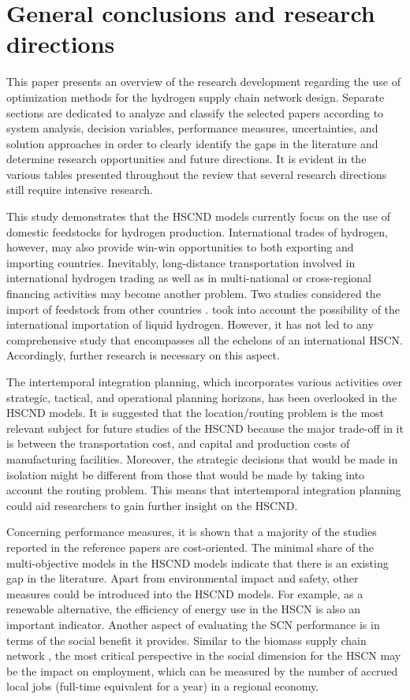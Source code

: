 \documentclass[11pt,3p]{elsarticle}
\begin{document}
\section{General conclusions and research directions}
\label{sec:synthesis}

This paper presents an overview of the research development regarding the use of optimization methods for the hydrogen supply chain network design. Separate sections are dedicated to analyze and classify the selected papers according to system analysis, decision variables, performance measures, uncertainties, and solution approaches in order to clearly identify the gaps in the literature and determine research opportunities and future directions. It is evident in the various tables presented throughout the review that several research directions still require intensive research.

This study demonstrates that the HSCND models currently focus on the use of domestic feedstocks for hydrogen production. International trades of hydrogen, however, may also provide win-win opportunities to both exporting and importing countries. Inevitably, long-distance transportation involved in international hydrogen trading as well as in multi-national or cross-regional financing activities may become another problem. Two studies considered the import of feedstock from other countries \citep{almansoori2012design,almansoori2009design}. \citet{moreno2017towards} took into account the possibility of the international importation of liquid hydrogen. However, it has not led to any comprehensive study that encompasses all the echelons of an international HSCN. Accordingly, further research is necessary on this aspect. 

The intertemporal integration planning, which incorporates various activities over strategic, tactical, and operational planning horizons, has been overlooked in the HSCND models. It is suggested that the location/routing problem is the most relevant subject for future studies of the HSCND because the major trade-off in it is between the transportation cost, and capital and production costs of manufacturing facilities. Moreover, the strategic decisions that would be made in isolation might be different from those that would be made by taking into account the routing problem. This means that intertemporal integration planning could aid researchers to gain further insight on the HSCND. 

Concerning performance measures, it is shown that a majority of the studies reported in the reference papers are cost-oriented. The minimal share of the multi-objective models in the HSCND models indicate that there is an existing gap in the literature. Apart from environmental impact and safety, other measures could be introduced into the HSCND models. For example, as a renewable alternative, the efficiency of energy use in the HSCN is also an important indicator. Another aspect of evaluating the SCN performance is in terms of the social benefit it provides. Similar to the biomass supply chain network \citep{yue2014biomass}, the most critical perspective in the social dimension for the HSCN may be the impact on employment, which can be measured by the number of accrued local jobs (full-time equivalent for a year) in a regional economy.
\end{document}
